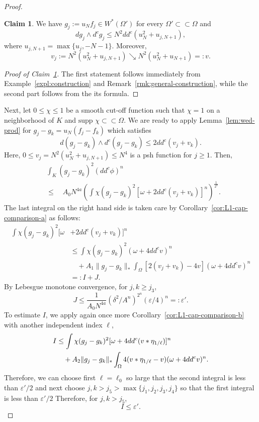 \documentclass{amsart}
\newcommand{\veps}{\varepsilon}
\newcommand{\de}{\delta}
\newcommand{\om}{\omega}
\newcommand{\Om}{\Omega}
\newcommand{\supp}{\mbox{supp }}
\theoremstyle{definition}
\newtheorem{claim}[thm]{Claim}
\numberwithin{thm}{section}
\numberwithin{equation}{section}
\renewcommand{\[}{\begin{equation}}
\renewcommand{\]}{\end{equation}}
\newcommand{\wed}{\wedge}
\begin{document}
\begin{proof}
\begin{claim} \label{cl:quasi-c} We have $g_j := u_N f_j \in W^*(\Om')$ for every $\Om'\subset\subset \Om$ and 
$$
	d g_j \wed d^c g_j \leq N^2 dd^c (u_N^2 + u_{j, N+1}),
$$
where $u_{j,N+1} = \max\{u_j, -N-1\}$. Moreover, 
$$
	v_j:=N^2(u_N^2 + u_{j,N+1})  \searrow  N^2(u_N^2 + u_{N+1})=:v.
$$
\end{claim}

\begin{proof}[Proof of Claim~\ref{cl:quasi-c}] The first statement follows immediately from Example~\ref{expl:construction} and Remark~\ref{rmk:general-construction}, while the second part follows from the its formula.
\end{proof}

Next, let $0\leq \chi \leq 1$ be a smooth cut-off function such that $\chi =1$ on a neighborhood of $K$ and $\supp\chi \subset \subset \Om$.
We are ready to apply Lemma~\ref{lem:wed-prod} for $g_j-g_k = u_N (f_j-f_k)$ which satisfies $$d(g_j-g_k) \wed d^c (g_j-g_k) \leq 2 dd^c (v_j+v_k).$$ Here, $0\leq v_j = N^2(u_N^2 + u_{j,N+1}) \leq N^4$ is a psh function for $j\geq 1$. Then,
\[\label{eq:cc-BT-markovb} \begin{aligned}
&	\int_K (g_j-g_k)^2 (dd^c\phi)^n \\
&\leq \quad A_0 N^{4a} \left(  \int \chi (g_j-g_k)^2 \left[\om + 2dd^c (v_j+v_k) \right]^n\right)^\frac{1}{2^n}. 
\end{aligned}\]
The last integral on the right hand side is taken care by Corollary~\ref{cor:L1-cap-comparison-a} as follows:
$$\begin{aligned}
	\int \chi (g_j-g_k)^2 [\om &+ 2dd^c(v_j+v_k)]^n \\
&\leq \int \chi (g_j-g_k)^2 (\om +4dd^c v)^n \\ 
&\quad + A_1 \|g_j-g_k\|_* \int_\Om \left[2(v_j+v_k) - 4v\right] (\om+ 4dd^cv)^n \\
&=: I +J.
\end{aligned}$$
By Lebesgue monotone convergence, for $j,k \geq j_3$, 
\[\label{eq:cc-j3}
	J \leq \frac{1}{A_0N^{4a}}\left(\de^{2}/A^n \right)^{2^n} (\veps/4)^n =: \veps'.
\] To estimate $I$,  we
apply again once  more Corollary~\ref{cor:L1-cap-comparison-b} with  another independent index $\ell$,
$$\notag\begin{aligned}
I %
&\leq  \int \chi (g_j-g_k)^2 [\om +4dd^c (v*\eta_{1/\ell})]^n  \\
&\quad + A_2 \|g_j-g_k\|_* \int_\Om 4(v*\eta_{1/\ell} -v ) (\om+ 4dd^cv)^n.
\end{aligned}$$
Therefore, we can choose first $\ell = \ell_0$ so large that the second integral is less than $\veps'/2$ %
and next choose $j,k > j_5> \max\{j_1,j_2, j_3, j_4\}$ so that the first integral is less than $\veps'/2$ %
Therefore, for $j,k>j_5$,
\[\label{eq:cc-j4}
I  \leq  \veps'.
\]


\end{proof}
\end{document}
